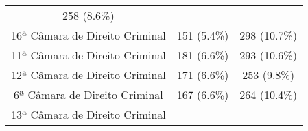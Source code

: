 \documentclass[10pt,]{article}
\begin{document}
\begin{longtable}[c]{@{}ccc@{}}
\begin{minipage}[t]{0.24\columnwidth}\centering\strut
258 (8.6\%)
\strut\end{minipage}\tabularnewline
\begin{minipage}[t]{0.39\columnwidth}\centering\strut
16ª Câmara de Direito Criminal
\strut\end{minipage} &
\begin{minipage}[t]{0.16\columnwidth}\centering\strut
151 (5.4\%)
\strut\end{minipage} &
\begin{minipage}[t]{0.24\columnwidth}\centering\strut
298 (10.7\%)
\strut\end{minipage}\tabularnewline
\begin{minipage}[t]{0.39\columnwidth}\centering\strut
11ª Câmara de Direito Criminal
\strut\end{minipage} &
\begin{minipage}[t]{0.16\columnwidth}\centering\strut
181 (6.6\%)
\strut\end{minipage} &
\begin{minipage}[t]{0.24\columnwidth}\centering\strut
293 (10.6\%)
\strut\end{minipage}\tabularnewline
\begin{minipage}[t]{0.39\columnwidth}\centering\strut
12ª Câmara de Direito Criminal
\strut\end{minipage} &
\begin{minipage}[t]{0.16\columnwidth}\centering\strut
171 (6.6\%)
\strut\end{minipage} &
\begin{minipage}[t]{0.24\columnwidth}\centering\strut
253 (9.8\%)
\strut\end{minipage}\tabularnewline
\begin{minipage}[t]{0.39\columnwidth}\centering\strut
6ª Câmara de Direito Criminal
\strut\end{minipage} &
\begin{minipage}[t]{0.16\columnwidth}\centering\strut
167 (6.6\%)
\strut\end{minipage} &
\begin{minipage}[t]{0.24\columnwidth}\centering\strut
264 (10.4\%)
\strut\end{minipage}\tabularnewline
\begin{minipage}[t]{0.39\columnwidth}\centering\strut
13ª Câmara de Direito Criminal
\strut\end{minipage} &
\begin{minipage}[t]{0.16\columnwidth}\centering\strut

\end{minipage}
\end{longtable}
\end{document}

